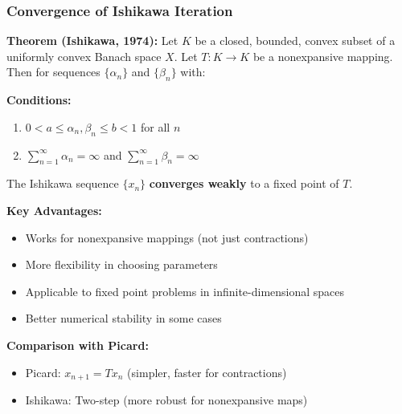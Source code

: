 \documentclass[aspectratio=169,10pt]{beamer}
\begin{document}
\begin{frame}
\frametitle{Convergence of Ishikawa Iteration}

\textbf{Theorem (Ishikawa, 1974):} Let $K$ be a closed, bounded, convex subset of a uniformly convex
Banach space $X$. Let $T: K \to K$ be a nonexpansive mapping. Then for sequences $\{\alpha_n\}$ and $\{\beta_n\}$
with:

\vspace{0.15cm}

\textbf{Conditions:}
\begin{enumerate}
    \item $0 < a \leq \alpha_n, \beta_n \leq b < 1$ for all $n$
    \item $\sum_{n=1}^{\infty} \alpha_n = \infty$ and $\sum_{n=1}^{\infty} \beta_n = \infty$
\end{enumerate}

The Ishikawa sequence $\{x_n\}$ \textbf{converges weakly} to a fixed point of $T$.

\vspace{0.3cm}

\textbf{Key Advantages:}
\begin{itemize}
    \item Works for nonexpansive mappings (not just contractions)
    \item More flexibility in choosing parameters
    \item Applicable to fixed point problems in infinite-dimensional spaces
    \item Better numerical stability in some cases
\end{itemize}

\vspace{0.3cm}

\textbf{Comparison with Picard:}
\begin{itemize}
    \item Picard: $x_{n+1} = Tx_n$ (simpler, faster for contractions)
    \item Ishikawa: Two-step (more robust for nonexpansive maps)
\end{itemize}

\end{frame}
\end{document}
